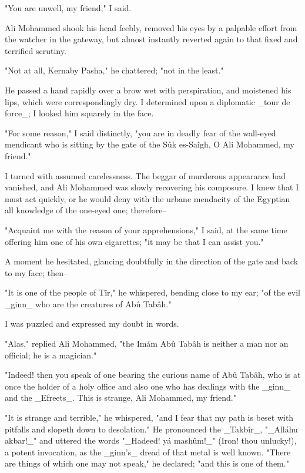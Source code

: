 "You are unwell, my friend," I said.

Ali Mohammed shook his head feebly, removed his eyes by a palpable
effort from the watcher in the gateway, but almost instantly reverted
again to that fixed and terrified scrutiny.

"Not at all, Kernaby Pasha," he chattered; "not in the least."

He passed a hand rapidly over a brow wet with perspiration, and
moistened his lips, which were correspondingly dry. I determined upon
a diplomatic _tour de force_; I looked him squarely in the face.

"For some reason," I said distinctly, "you are in deadly fear of the
wall-eyed mendicant who is sitting by the gate of the Sûk es-Saîgh,
O Ali Mohammed, my friend."

I turned with assumed carelessness. The beggar of murderous appearance
had vanished, and Ali Mohammed was slowly recovering his composure.
I knew that I must act quickly, or he would deny with the urbane
mendacity of the Egyptian all knowledge of the one-eyed one;
therefore--

"Acquaint me with the reason of your apprehensions," I said, at the
same time offering him one of his own cigarettes; "it may be that I
can assist you."

A moment he hesitated, glancing doubtfully in the direction of the
gate and back to my face; then--

"It is one of the people of Tîr," he whispered, bending close to my
ear; "of the evil _ginn_ who are the creatures of Abû Tabâh."

I was puzzled and expressed my doubt in words.

"Alas," replied Ali Mohammed, "the Imám Abû Tabâh is neither a man nor
an official; he is a magician."

"Indeed! then you speak of one bearing the curious name of Abû Tabâh,
who is at once the holder of a holy office and also one who has
dealings with the _ginn_ and the _Efreets_. This is strange, Ali
Mohammed, my friend."

"It is strange and terrible," he whispered, "and I fear that my path
is beset with pitfalls and slopeth down to desolation." He pronounced
the _Takbîr_, "_Alláhu akbar!_" and uttered the words "_Hadeed! yá
mashûm!_" (Iron! thou unlucky!), a potent invocation, as the _ginn's_
dread of that metal is well known. "There are things of which one may
not speak," he declared; "and this is one of them."

